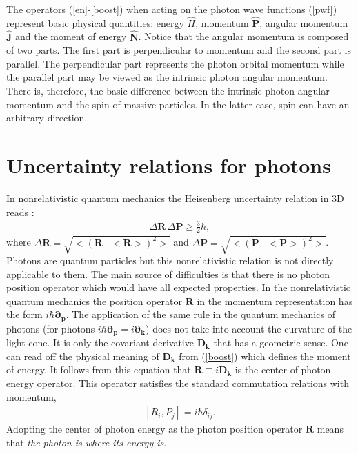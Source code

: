 \documentclass[onecolumn,aps,pra,12pt]{revtex4-1}
\begin{document}
The operators (\ref{en}-\ref{boost}) when acting on the photon wave functions (\ref{pwf}) represent basic physical quantities: energy ${\hat H}$, momentum ${\hat{\bm P}}$, angular momentum ${\hat{\bm J}}$ and the moment of energy ${\hat{\bm N}}$. Notice that the angular momentum is composed of two parts. The first part is perpendicular to momentum and the second part is parallel. The perpendicular part represents the photon orbital momentum while the parallel part may be viewed as the intrinsic photon angular momentum. There is, therefore, the basic difference between the intrinsic photon angular momentum and the spin of massive particles. In the latter case, spin can have an arbitrary direction.

\section{Uncertainty relations for photons}

In nonrelativistic quantum mechanics the Heisenberg uncertainty relation in 3D reads :
\begin{align}\label{hur}
\Delta{\bm R}\,\Delta{\bm P}\ge\frac{3}{2}\hbar,
\end{align}
where $\Delta{\bm R}=\sqrt{<({\bm R}-<{\bm R}>)^2>}$ and $\Delta{\bm P}=\sqrt{<({\bm P}-<{\bm P}>)^2>}$.
Photons are quantum particles but this nonrelativistic relation is not directly applicable to them. The main source of difficulties is that there is no photon position operator which would have all expected properties. In the nonrelativistic quantum mechanics the position operator ${\bm R}$ in the momentum representation has the form $i\hbar{\bm{\partial}_{\bm p}}$. The application of the same rule in the quantum mechanics of photons (for photons $i\hbar{\bm{\partial}}_{\bm p}=i{\bm{\partial}}_{\bm k}$) does not take into account the curvature of the light cone. It is only the covariant derivative ${\bm D}_{\bm k}$ that has a geometric sense. One can read off the physical meaning of ${\bm D}_{\bm k}$ from (\ref{boost}) which defines the moment of energy. It follows from this equation that ${\bm R}\equiv i{\bm D}_{\bm k}$ is the center of photon energy operator. This operator satisfies the standard commutation relations with momentum,
\begin{align}\label{crel}
[R_i,P_j]=i\hbar\delta_{ij}.
\end{align}
Adopting the center of photon energy as the photon position operator ${\bm R}$ means that {\em the photon is where its energy is}.
\end{document}
